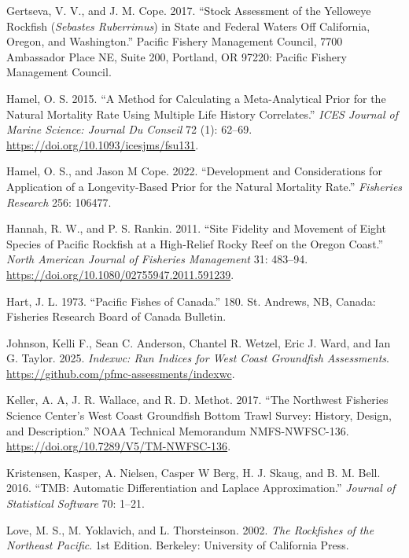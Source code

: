 \documentclass[
  english,
]{article}
\newlength{\cslhangindent}
\newenvironment{CSLReferences}[2] %
 {\begin{list}{}{%
  \setlength{\itemindent}{0pt}
  \setlength{\leftmargin}{0pt}
  \setlength{\parsep}{0pt}
  \ifodd #1
   \setlength{\leftmargin}{\cslhangindent}
   \setlength{\itemindent}{-1\cslhangindent}
  \fi
  \setlength{\itemsep}{#2\baselineskip}}}
 {\end{list}}
\begin{document}
\begin{CSLReferences}{1}{0}
Gertseva, V. V., and J. M. Cope. 2017. {``Stock Assessment of the
Yelloweye Rockfish (\emph{{Sebastes} Ruberrimus}) in State and {Federal}
Waters Off {California}, {Oregon}, and {Washington}.''} Pacific Fishery
Management Council, 7700 Ambassador Place NE, Suite 200, Portland, OR
97220: Pacific Fishery Management Council.

Hamel, O. S. 2015. {``A Method for Calculating a Meta-Analytical Prior
for the Natural Mortality Rate Using Multiple Life History
Correlates.''} \emph{ICES Journal of Marine Science: Journal Du Conseil}
72 (1): 62--69. \url{https://doi.org/10.1093/icesjms/fsu131}.

Hamel, O. S., and Jason M Cope. 2022. {``Development and Considerations
for Application of a Longevity-Based Prior for the Natural Mortality
Rate.''} \emph{Fisheries Research} 256: 106477.

Hannah, R. W., and P. S. Rankin. 2011. {``Site Fidelity and Movement of
Eight Species of Pacific Rockfish at a High-Relief Rocky Reef on the
Oregon Coast.''} \emph{North American Journal of Fisheries Management}
31: 483--94. \url{https://doi.org/10.1080/02755947.2011.591239}.

Hart, J. L. 1973. {``Pacific Fishes of Canada.''} 180. St. Andrews, NB,
Canada: Fisheries Research Board of Canada Bulletin.

Johnson, Kelli F., Sean C. Anderson, Chantel R. Wetzel, Eric J. Ward,
and Ian G. Taylor. 2025. \emph{Indexwc: Run Indices for West Coast
Groundfish Assessments}.
\url{https://github.com/pfmc-assessments/indexwc}.

Keller, A. A, J. R. Wallace, and R. D. Methot. 2017. {``The Northwest
Fisheries Science Center's West Coast Groundfish Bottom Trawl Survey:
History, Design, and Description.''} NOAA Technical Memorandum
NMFS-NWFSC-136. \url{https://doi.org/10.7289/V5/TM-NWFSC-136}.

Kristensen, Kasper, A. Nielsen, Casper W Berg, H. J. Skaug, and B. M.
Bell. 2016. {``{TMB}: {Automatic} {Differentiation} and {Laplace}
{Approximation}.''} \emph{Journal of Statistical Software} 70: 1--21.

Love, M. S., M. Yoklavich, and L. Thorsteinson. 2002. \emph{The
{Rockfishes} of the {Northeast} {Pacific}}. 1st Edition. Berkeley:
University of California Press.


\end{CSLReferences}
\end{document}
